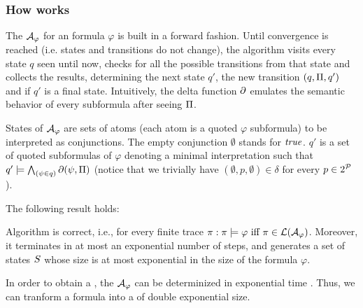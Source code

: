 \subsubsection*{How \LDLfToNFA works}
The \NFA $\mathcal{A}_\varphi$ for an \LDLf formula $\varphi$ is built in a forward fashion. Until convergence is reached (i.e. states and transitions do not change), the algorithm visits every state $q$ seen until now, checks for all the possible transitions from that state and collects the results, determining the next state $q'$, the new transition $(q, \Pi, q')$ and if $q'$ is a final state. Intuitively, the delta function $\partial$ emulates the semantic behavior of every \LLf subformula after seeing $\Pi$.

 States of $\mathcal{A}_\varphi$ are sets of atoms (each atom is a quoted $\varphi$ subformula) to be interpreted as conjunctions. The empty conjunction $\emptyset$ stands for $\mathit{true}$. $q'$ is a set of quoted subformulas of $\varphi$ denoting a minimal interpretation such that $q' \models \bigwedge_{(\psi\in q)} \partial\lparen \psi,\Pi \rparen$ (notice that we trivially have $(\emptyset, p,\emptyset) \in \delta$ for every $p \in 2^{\mathcal{P}}$).

The following result holds:
\begin{theorem}\label{ldlf2nfa-correctness}
	Algorithm \LDLfToNFA is correct, i.e., for every finite trace $\pi: \pi \models \varphi \ \text{iff}\  \pi \in \mathcal{L}(\mathcal{A}_\varphi)$. Moreover, it terminates in at most an exponential number of steps, and generates a set of states $S$ whose size is at most exponential in the size of the formula $\varphi$.
	
\end{theorem}

In order to obtain a \DFA, the \NFA $\mathcal{A}_\varphi$ can be determinized in exponential time \citep{Rabin:1959:FAD:1661907.1661909}. Thus, we can tranform a \LLf formula into a \DFA of double exponential size.

